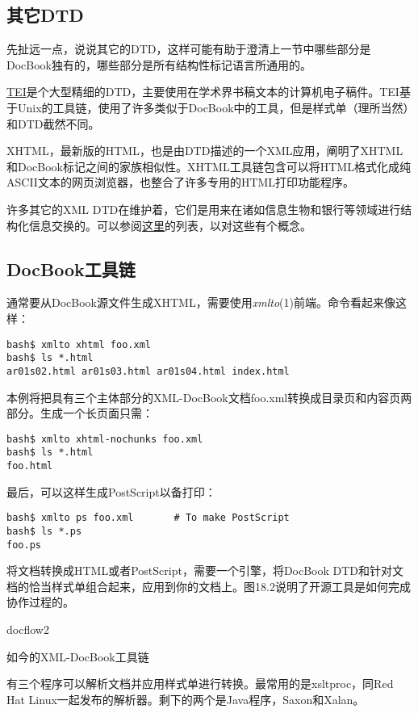 \documentclass[12pt,oneside]{ctexbook}
\begin{document}
\begin{common-format}
\subsection{其它DTD}
先扯远一点，说说其它的DTD，这样可能有助于澄清上一节中哪些部分是DocBook独有的，哪些部分是所有结构性标记语言所通用的。

\href{http://www.tei-c.org/}{TEI}是个大型精细的DTD，主要使用在学术界书稿文本的计算机电子稿件。TEI基于Unix的工具链，使用了许多类似于DocBook中的工具，但是样式单（理所当然）和DTD截然不同。

XHTML，最新版的HTML，也是由DTD描述的一个XML应用，阐明了XHTML和DocBook标记之间的家族相似性。XHTML工具链包含可以将HTML格式化成纯ASCII文本的网页浏览器，也整合了许多专用的HTML打印功能程序。

许多其它的XML DTD在维护着，它们是用来在诸如信息生物和银行等领域进行结构化信息交换的。可以参阅\href{http://www.xml.com/pub/rg/DTD_Repositories}{这里}的列表，以对这些有个概念。

\subsection{DocBook工具链}
通常要从DocBook源文件生成XHTML，需要使用\textit{xmlto}(1)前端。命令看起来像这样：
\begin{Verbatim}
bash$ xmlto xhtml foo.xml
bash$ ls *.html
ar01s02.html ar01s03.html ar01s04.html index.html
\end{Verbatim}

本例将把具有三个主体部分的XML-DocBook文档foo.xml转换成目录页和内容页两部分。生成一个长页面只需：
\begin{Verbatim}
bash$ xmlto xhtml-nochunks foo.xml
bash$ ls *.html
foo.html
\end{Verbatim}

最后，可以这样生成PostScript以备打印：
\begin{Verbatim}
bash$ xmlto ps foo.xml       # To make PostScript
bash$ ls *.ps
foo.ps
\end{Verbatim}

将文档转换成HTML或者PostScript，需要一个引擎，将DocBook DTD和针对文档的恰当样式单组合起来，应用到你的文档上。图18.2说明了开源工具是如何完成协作过程的。
\begin{linefig}[0.8]{docflow2}
\caption{如今的XML-DocBook工具链}
\label{fig:docflow2}
\end{linefig}

有三个程序可以解析文档并应用样式单进行转换。最常用的是xsltproc，同Red Hat Linux一起发布的解析器。剩下的两个是Java程序，Saxon和Xalan。


\end{common-format}
\end{document}
